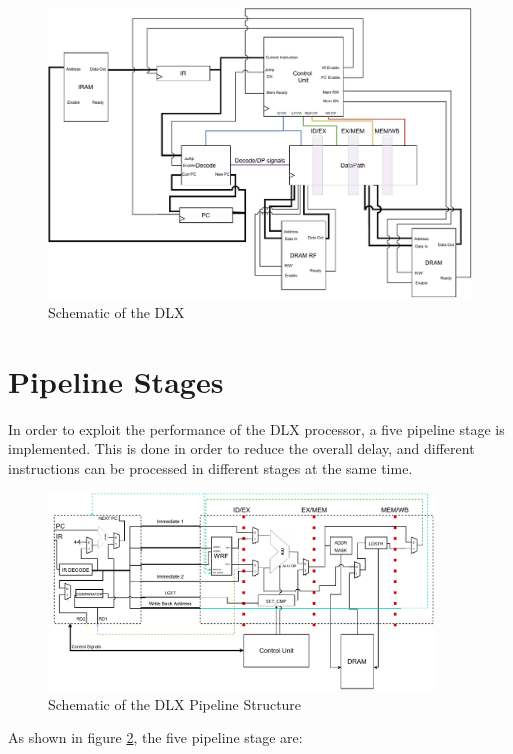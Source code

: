 \begin{figure}[ht]
    \centering
    \includegraphics[width=1\textwidth]{chapters/2_dlx/images/DLX.pdf}
    \caption{Schematic of the DLX}
    \label{DLX}
\end{figure} 

\newpage
\section{Pipeline Stages}

In order to exploit the performance of the DLX processor, a five pipeline stage is implemented. This is done in order to reduce the overall delay, and different instructions can be processed in different stages at the same time.

\begin{figure}[H]
    \centering
    \includegraphics[width=0.91\textwidth]{chapters/2_dlx/images/DLX_DP.pdf}
    \caption{Schematic of the DLX Pipeline Structure}
    \label{DLX_DP}
\end{figure} 

As shown in figure \ref{DLX_DP}, the five pipeline stage are:

